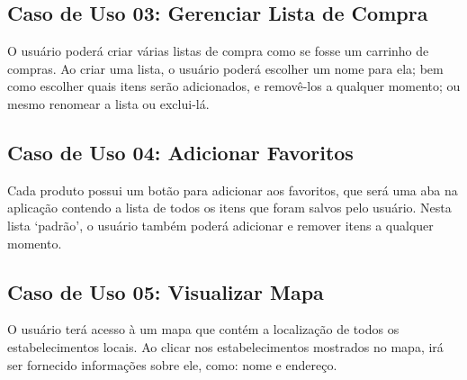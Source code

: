 \subsection{Caso de Uso 03: Gerenciar Lista de Compra}

O usuário poderá criar várias listas de compra como se fosse um carrinho de compras. Ao criar uma lista, o usuário poderá escolher um nome para ela; bem como escolher quais itens serão adicionados, e removê-los a qualquer momento; ou mesmo renomear a lista ou exclui-lá.

\subsection{Caso de Uso 04: Adicionar Favoritos}

Cada produto possui um botão para adicionar aos favoritos, que será uma aba na aplicação contendo a lista de todos os itens que foram salvos pelo usuário. Nesta lista ‘padrão’, o usuário também poderá adicionar e remover itens a qualquer momento.

\subsection{Caso de Uso 05: Visualizar Mapa}

O usuário terá acesso à um mapa que contém a localização de todos os estabelecimentos locais. Ao clicar nos estabelecimentos mostrados no mapa, irá ser fornecido informações sobre ele, como: nome e endereço.